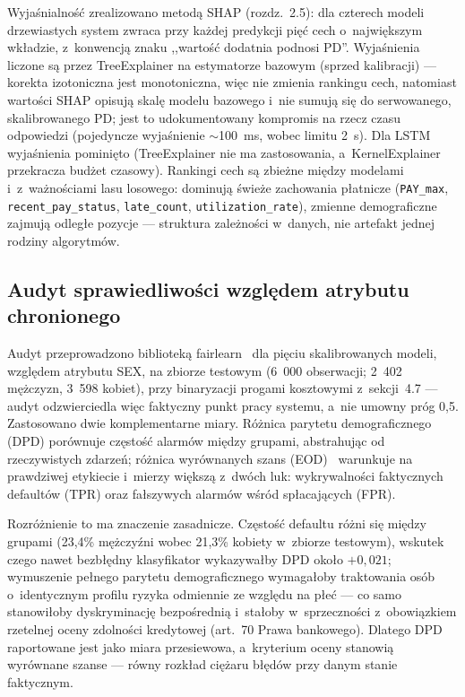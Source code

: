 Wyjaśnialność zrealizowano metodą SHAP (rozdz.~2.5): dla czterech modeli
drzewiastych system zwraca przy każdej predykcji pięć cech o~największym
wkładzie, z~konwencją znaku ,,wartość dodatnia podnosi PD''. Wyjaśnienia
liczone są przez TreeExplainer na estymatorze bazowym (sprzed kalibracji) ---
korekta izotoniczna jest monotoniczna, więc nie zmienia rankingu cech,
natomiast wartości SHAP opisują skalę modelu bazowego i~nie sumują się do
serwowanego, skalibrowanego PD; jest to udokumentowany kompromis na rzecz czasu
odpowiedzi (pojedyncze wyjaśnienie $\sim$100~ms, wobec limitu 2~s). Dla LSTM
wyjaśnienia pominięto (TreeExplainer nie ma zastosowania, a~KernelExplainer
przekracza budżet czasowy). Rankingi cech są zbieżne między modelami
i~z~ważnościami lasu losowego: dominują świeże zachowania płatnicze
(\texttt{PAY\_max}, \texttt{recent\_pay\_status}, \texttt{late\_count},
\texttt{utilization\_rate}), zmienne demograficzne zajmują odległe pozycje ---
struktura zależności w~danych, nie artefakt jednej rodziny algorytmów.

\subsection{Audyt sprawiedliwości względem atrybutu chronionego}

Audyt przeprowadzono biblioteką fairlearn~\cite{bird2020} dla pięciu
skalibrowanych modeli, względem atrybutu SEX, na zbiorze testowym (6~000
obserwacji; 2~402 mężczyzn, 3~598 kobiet), przy binaryzacji progami kosztowymi
z~sekcji~4.7 --- audyt odzwierciedla więc faktyczny punkt pracy systemu, a~nie
umowny próg 0,5. Zastosowano dwie komplementarne miary. Różnica parytetu
demograficznego (DPD) porównuje częstość alarmów między grupami, abstrahując od
rzeczywistych zdarzeń; różnica wyrównanych szans (EOD)~\cite{hardt2016}
warunkuje na prawdziwej etykiecie i~mierzy większą z~dwóch luk: wykrywalności
faktycznych defaultów (TPR) oraz fałszywych alarmów wśród spłacających (FPR).

Rozróżnienie to ma znaczenie zasadnicze. Częstość defaultu różni się między
grupami (23,4\% mężczyźni wobec 21,3\% kobiety w~zbiorze testowym), wskutek
czego nawet bezbłędny klasyfikator wykazywałby DPD około $+0{,}021$; wymuszenie
pełnego parytetu demograficznego wymagałoby traktowania osób o~identycznym
profilu ryzyka odmiennie ze względu na płeć --- co samo stanowiłoby
dyskryminację bezpośrednią i~stałoby w~sprzeczności z~obowiązkiem rzetelnej
oceny zdolności kredytowej (art.~70 Prawa bankowego). Dlatego DPD raportowane
jest jako miara przesiewowa, a~kryterium oceny stanowią wyrównane szanse ---
równy rozkład ciężaru błędów przy danym stanie faktycznym.

